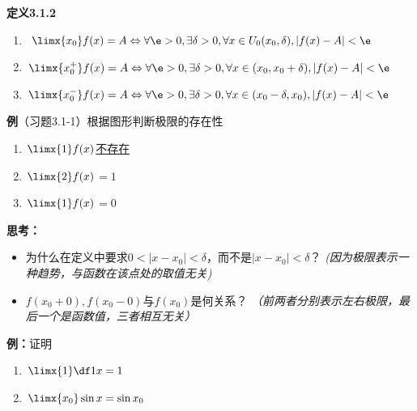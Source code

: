 {\bf 定义3.1.2}
\begin{enumerate}[(1)]
  \setlength{\itemindent}{1cm}
  \item $\limx{x_0}f(x)=A\Leftrightarrow\forall \e>0,\exists\delta>0,\forall
  x\in U_0(x_0,\delta),|f(x)-A|<\e$
  \item $\limx{x_0^+}f(x)=A\Leftrightarrow\forall \e>0,\exists\delta>0,\forall
  x\in(x_0,x_0+\delta),|f(x)-A|<\e$
  \item $\limx{x_0^-}f(x)=A\Leftrightarrow\forall \e>0,\exists\delta>0,\forall
  x\in(x_0-\delta,x_0),|f(x)-A|<\e$
\end{enumerate}

{\bf 例}（习题3.1-1）根据图形判断极限的存在性
\begin{center}
\end{center}
\begin{enumerate}[(1)]
  \setlength{\itemindent}{1cm}
  \item $\limx{1}f(x)$\underline{不存在}
  \item $\limx{2}f(x)$\underline{$=1$}
  \item $\limx{1}f(x)$\underline{$=0$}
\end{enumerate}

{\bf 思考：}
\begin{itemize}
  \setlength{\itemindent}{1cm}
  \item 为什么在定义中要求$0<|x-x_0|<\delta$，而不是$|x-x_0|<\delta$？
  {\it (因为极限表示一种趋势，与函数在该点处的取值无关)}
  \item $f(x_0+0),f(x_0-0)$与$f(x_0)$是何关系？
  {\it（前两者分别表示左右极限，最后一个是函数值，三者相互无关）}
\end{itemize}

{\bf 例：}证明
\begin{enumerate}[(1)]
  \setlength{\itemindent}{1cm}
  \item $\limx{1}\df1x=1$
  \item $\limx{x_0}\sin x=\sin x_0$
\end{enumerate}


